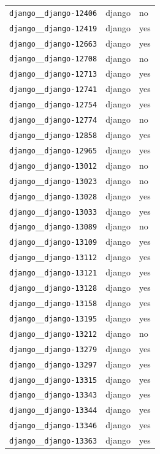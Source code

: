 \begin{longtable}{@{}p{}lp{}@{}}
\texttt{django\_\_django-12406} & django & no \\
\texttt{django\_\_django-12419} & django & yes \\
\texttt{django\_\_django-12663} & django & yes \\
\texttt{django\_\_django-12708} & django & no \\
\texttt{django\_\_django-12713} & django & yes \\
\texttt{django\_\_django-12741} & django & yes \\
\texttt{django\_\_django-12754} & django & yes \\
\texttt{django\_\_django-12774} & django & no \\
\texttt{django\_\_django-12858} & django & yes \\
\texttt{django\_\_django-12965} & django & yes \\
\texttt{django\_\_django-13012} & django & no \\
\texttt{django\_\_django-13023} & django & no \\
\texttt{django\_\_django-13028} & django & yes \\
\texttt{django\_\_django-13033} & django & yes \\
\texttt{django\_\_django-13089} & django & no \\
\texttt{django\_\_django-13109} & django & yes \\
\texttt{django\_\_django-13112} & django & yes \\
\texttt{django\_\_django-13121} & django & yes \\
\texttt{django\_\_django-13128} & django & yes \\
\texttt{django\_\_django-13158} & django & yes \\
\texttt{django\_\_django-13195} & django & yes \\
\texttt{django\_\_django-13212} & django & no \\
\texttt{django\_\_django-13279} & django & yes \\
\texttt{django\_\_django-13297} & django & yes \\
\texttt{django\_\_django-13315} & django & yes \\
\texttt{django\_\_django-13343} & django & yes \\
\texttt{django\_\_django-13344} & django & yes \\
\texttt{django\_\_django-13346} & django & yes \\
\texttt{django\_\_django-13363} & django & yes \\

\end{longtable}
